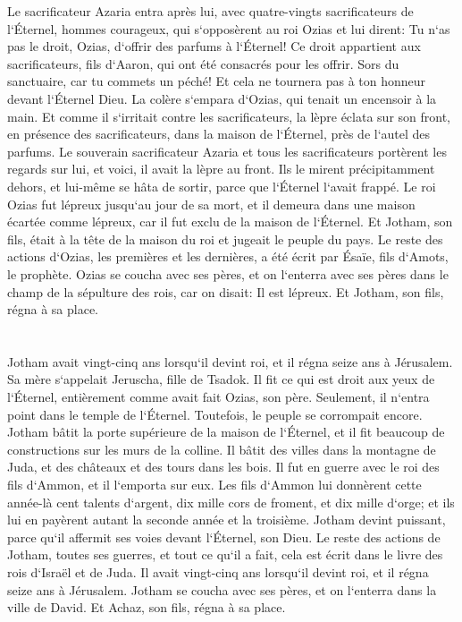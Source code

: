 \verse Le sacrificateur Azaria entra après lui, avec quatre-vingts sacrificateurs de l`Éternel, 
\verse hommes courageux, qui s`opposèrent au roi Ozias et lui dirent: Tu n`as pas le droit, Ozias, d`offrir des parfums à l`Éternel! Ce droit appartient aux sacrificateurs, fils d`Aaron, qui ont été consacrés pour les offrir. Sors du sanctuaire, car tu commets un péché! Et cela ne tournera pas à ton honneur devant l`Éternel Dieu. 
\verse La colère s`empara d`Ozias, qui tenait un encensoir à la main. Et comme il s`irritait contre les sacrificateurs, la lèpre éclata sur son front, en présence des sacrificateurs, dans la maison de l`Éternel, près de l`autel des parfums. 
\verse Le souverain sacrificateur Azaria et tous les sacrificateurs portèrent les regards sur lui, et voici, il avait la lèpre au front. Ils le mirent précipitamment dehors, et lui-même se hâta de sortir, parce que l`Éternel l`avait frappé. 
\verse Le roi Ozias fut lépreux jusqu`au jour de sa mort, et il demeura dans une maison écartée comme lépreux, car il fut exclu de la maison de l`Éternel. Et Jotham, son fils, était à la tête de la maison du roi et jugeait le peuple du pays. 
\verse Le reste des actions d`Ozias, les premières et les dernières, a été écrit par Ésaïe, fils d`Amots, le prophète. 
\verse Ozias se coucha avec ses pères, et on l`enterra avec ses pères dans le champ de la sépulture des rois, car on disait: Il est lépreux. Et Jotham, son fils, régna à sa place. 

\chapter{}

\verse Jotham avait vingt-cinq ans lorsqu`il devint roi, et il régna seize ans à Jérusalem. Sa mère s`appelait Jeruscha, fille de Tsadok. 
\verse Il fit ce qui est droit aux yeux de l`Éternel, entièrement comme avait fait Ozias, son père. Seulement, il n`entra point dans le temple de l`Éternel. Toutefois, le peuple se corrompait encore. 
\verse Jotham bâtit la porte supérieure de la maison de l`Éternel, et il fit beaucoup de constructions sur les murs de la colline. 
\verse Il bâtit des villes dans la montagne de Juda, et des châteaux et des tours dans les bois. 
\verse Il fut en guerre avec le roi des fils d`Ammon, et il l`emporta sur eux. Les fils d`Ammon lui donnèrent cette année-là cent talents d`argent, dix mille cors de froment, et dix mille d`orge; et ils lui en payèrent autant la seconde année et la troisième. 
\verse Jotham devint puissant, parce qu`il affermit ses voies devant l`Éternel, son Dieu. 
\verse Le reste des actions de Jotham, toutes ses guerres, et tout ce qu`il a fait, cela est écrit dans le livre des rois d`Israël et de Juda. 
\verse Il avait vingt-cinq ans lorsqu`il devint roi, et il régna seize ans à Jérusalem. 
\verse Jotham se coucha avec ses pères, et on l`enterra dans la ville de David. Et Achaz, son fils, régna à sa place. 

